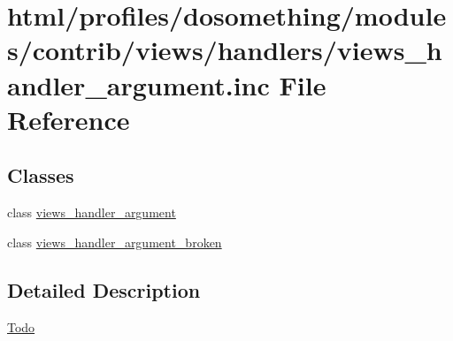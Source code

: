\hypertarget{views__handler__argument_8inc}{
\section{html/profiles/dosomething/modules/contrib/views/handlers/views\_\-handler\_\-argument.inc File Reference}
\label{views__handler__argument_8inc}
}
\subsection*{Classes}
\begin{DoxyCompactItemize}
\item 
class \hyperlink{classviews__handler__argument}{views\_\-handler\_\-argument}
\item 
class \hyperlink{classviews__handler__argument__broken}{views\_\-handler\_\-argument\_\-broken}
\end{DoxyCompactItemize}


\subsection{Detailed Description}
\begin{Desc}
\item[\hyperlink{todo__todo000072}{Todo}]\end{Desc}
